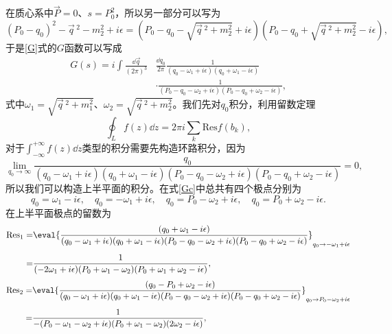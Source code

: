 在质心系中$\vec{P}=0$、$s=P_{0}^2$，所以另一部分可以写为
\begin{equation}
	(P_{0}-q_{0})^2-\vec{q}\,^2-m_{2}^2+i\epsilon=(P_{0}-q_{0}-\sqrt{\vec{q}\,^2+m^2_{2}}+i\epsilon)(P_{0}-q_{0}+\sqrt{\vec{q}\,^2+m^2_{2}}-i\epsilon),
\end{equation}
于是\eqref{G}式的$G$函数可以写成
\begin{equation}
\label{Gc}
\begin{split}
	G(s)=i\int\frac{\dd{\vec{q}}}{(2\pi)^{3}}&\frac{\dd{q_{0}}}{2\pi}\frac{1}{(q_{0}-\omega_1+i\epsilon)(q_{0}+\omega_1-i\epsilon)}\\[1ex]
	&\cdot\frac{1}{(P_{0}-q_{0}-\omega_2+i\epsilon)(P_{0}-q_{0}+\omega_2-i\epsilon)},
\end{split}
\end{equation}
式中$\omega_{1}=\sqrt{\vec{q}\,^2+m_{1}^2}$、$\omega_{2}=\sqrt{\vec{q}\,^2+m_{2}^2}$。我们先对$q_{0}$积分，利用留数定理
\begin{equation}
	\oint_{L}f(z)\dd{z}=2\pi i\sum_{k}\text{Res}f(b_{k}),
\end{equation}
对于$\int_{-\infty}^{+\infty}f(z)\dd{z}$类型的积分需要先构造环路积分，因为
\begin{equation}
	\lim_{q_{0}\to\infty}\frac{q_{0}}{(q_{0}-\omega_1+i\epsilon)(q_{0}+\omega_1-i\epsilon)(P_{0}-q_{0}-\omega_2+i\epsilon)(P_{0}-q_{0}+\omega_2-i\epsilon)}=0,
\end{equation}
所以我们可以构造上半平面的积分。在式\eqref{Gc}中总共有四个极点分别为
\begin{equation}
	q_{0}=\omega_{1}-i\epsilon,\quad q_{0}=-\omega_{1}+i\epsilon,\quad q_{0}=P_{0}-\omega_{2}+i\epsilon,\quad q_{0}=P_{0}+\omega_{2}-i\epsilon.
\end{equation}
在上半平面极点的留数为
\begin{equation}
	\begin{aligned}[b]
		\text{Res}_{1}=&\eval{\frac{(q_{0}+\omega_1-i\epsilon)}{(q_{0}-\omega_1+i\epsilon)(q_{0}+\omega_1-i\epsilon)(P_{0}-q_{0}-\omega_2+i\epsilon)(P_{0}-q_{0}+\omega_2-i\epsilon)}}_{q_{0}\to-\omega_{1}+i\epsilon}\\[1ex]
	=&\frac{1}{(-2\omega_{1}+i\epsilon)(P_{0}+\omega_{1}-\omega_{2})(P_{0}+\omega_{1}+\omega_{2}-i\epsilon)},
	\end{aligned}
\end{equation}
\begin{equation}
	\begin{aligned}[b]
		\text{Res}_{2}=&\eval{\frac{(q_{0}-P_{0}+\omega_2-i\epsilon)}{(q_{0}-\omega_1+i\epsilon)(q_{0}+\omega_1-i\epsilon)(P_{0}-q_{0}-\omega_2+i\epsilon)(P_{0}-q_{0}+\omega_2-i\epsilon)}}_{q_{0}\to P_{0}-\omega_{2}+i\epsilon}\\[1ex]
	=&\frac{1}{-(P_{0}-\omega_{1}-\omega_{2}+i\epsilon)(P_{0}+\omega_{1}-\omega_{2})(2\omega_{2}-i\epsilon)},
	\end{aligned}
\end{equation}
